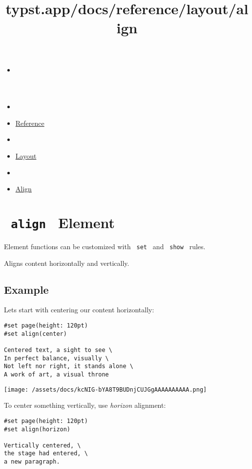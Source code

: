 \title{typst.app/docs/reference/layout/align}

\begin{itemize}
\tightlist
\item
  \href{/docs}{}
\item
  
\item
  \href{/docs/reference/}{Reference}
\item
  
\item
  \href{/docs/reference/layout/}{Layout}
\item
  
\item
  \href{/docs/reference/layout/align/}{Align}
\end{itemize}

\section{\texorpdfstring{\texttt{\ align\ } {{ Element
}}}{ align   Element }}\label{summary}

\label{element-tooltip}
Element functions can be customized with \texttt{\ set\ } and
\texttt{\ show\ } rules.

Aligns content horizontally and vertically.

\subsection{Example}\label{example}

Let\textquotesingle s start with centering our content horizontally:

\begin{verbatim}
#set page(height: 120pt)
#set align(center)

Centered text, a sight to see \
In perfect balance, visually \
Not left nor right, it stands alone \
A work of art, a visual throne
\end{verbatim}

\texttt{[image: /assets/docs/kcNIG-bYA8T9BUDnjCUJGgAAAAAAAAAA.png]}

To center something vertically, use \emph{horizon} alignment:

\begin{verbatim}
#set page(height: 120pt)
#set align(horizon)

Vertically centered, \
the stage had entered, \
a new paragraph.
\end{verbatim}

